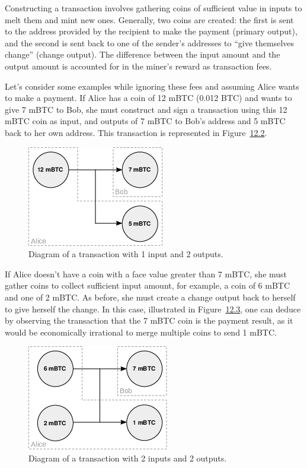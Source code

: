 \documentclass[
  a5paper,
  smalldemyvopaper,10pt,twoside,onecolumn,openright,extrafontsizes,hidelinks]{memoir}
\begin{document}
Constructing a transaction involves gathering coins of sufficient value
in inputs to melt them and mint new ones. Generally, two coins are
created: the first is sent to the address provided by the recipient to
make the payment (primary output), and the second is sent back to one of
the sender's addresses to ``give themselves change'' (change output).
The difference between the input amount and the output amount is
accounted for in the miner's reward as transaction fees.

Let's consider some examples while ignoring these fees and assuming
Alice wants to make a payment. If Alice has a coin of 12 mBTC (0.012
BTC) and wants to give 7 mBTC to Bob, she must construct and sign a
transaction using this 12 mBTC coin as input, and outputs of 7 mBTC to
Bob's address and 5 mBTC back to her own address. This transaction is
represented in Figure~\hyperref[fig:transaction-1i-2o]{12.2}.

\begin{figure}

{\centering \includegraphics{chapters/img/transaction-1i-2o.png}

}

\caption{Diagram of a transaction with 1 input and 2 outputs.}

\end{figure}%

If Alice doesn't have a coin with a face value greater than 7 mBTC, she
must gather coins to collect sufficient input amount, for example, a
coin of 6 mBTC and one of 2 mBTC. As before, she must create a change
output back to herself to give herself the change. In this case,
illustrated in Figure~\hyperref[fig:transaction-2i-2o]{12.3}, one can
deduce by observing the transaction that the 7 mBTC coin is the payment
result, as it would be economically irrational to merge multiple coins
to send 1 mBTC.

\begin{figure}

{\centering \includegraphics{chapters/img/transaction-2i-2o.png}

}

\caption{Diagram of a transaction with 2 inputs and 2 outputs.}

\end{figure}%
\end{document}
